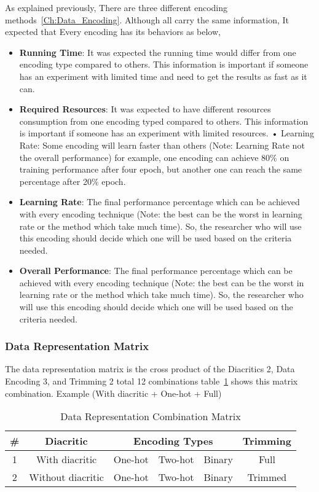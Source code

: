 As explained previously, There are three different encoding methods~\ref{Ch:Data_Encoding}. Although all carry the same information, It expected that Every encoding has its behaviors as below,
\begin{itemize}
  \item \textbf{Running Time}: It was expected the running time would differ from one encoding type compared to others. This information is important if someone has an experiment with limited time and need to get the results as fast as it can.
  \item \textbf{Required Resources}: It was expected to have different resources consumption from one encoding typed compared to others. This information is important if someone has an experiment with limited resources.
  • Learning Rate: Some encoding will learn faster than others (Note: Learning Rate not the overall performance) for example, one encoding can achieve 80\% on training performance after four epoch, but another one can reach the same percentage after 20\% epoch.
  \item \textbf{Learning Rate}: The final performance percentage which can be achieved with every encoding technique (Note: the best can be the worst in learning rate or the method which take much time). So, the researcher who will use this encoding should decide which one will be used based on the criteria needed.

  \item \textbf{Overall Performance}: The final performance percentage which can be achieved with every encoding technique (Note: the best can be the worst in learning rate or the method which take much time). So, the researcher who will use this encoding should decide which one will be used based on the criteria needed.

\end{itemize}

\subsubsection{Data Representation Matrix}

The data representation matrix is the cross product of the Diacritics 2, Data Encoding 3, and Trimming 2 total 12 combinations table~\ref{Tab:Data_Representation_Matrix} shows this matrix combination. Example (With diacritic + One-hot + Full)


\begin{table}[t]
  \centering
  \begin{tabular}{c c c c c c}
    \hline
    \textbf{\#} & \textbf{Diacritic} & \multicolumn{3}{c}{\textbf{Encoding Types}}  & \textbf{Trimming} \\
    
    \hline
    1 & With diacritic & One-hot & Two-hot & Binary & Full    \\
    \hline
    2 & Without diacritic & One-hot & Two-hot & Binary & Trimmed \\
    \hline
  \end{tabular}
  \caption{Data Representation Combination Matrix}\label{Tab:Data_Representation_Matrix}
\end{table}



